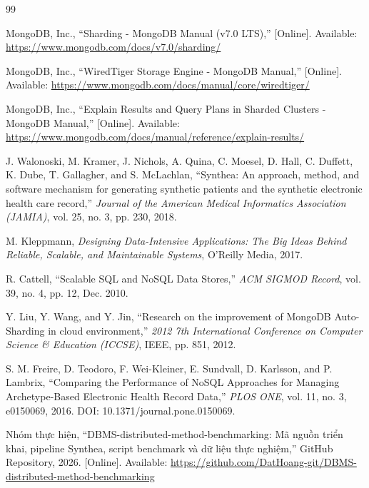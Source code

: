 \documentclass[a4paper,12pt,oneside]{book}
\begin{document}
\begin{thebibliography}{99}

MongoDB, Inc., “Sharding - MongoDB Manual (v7.0 LTS),” [Online]. Available: \url{https://www.mongodb.com/docs/v7.0/sharding/}

MongoDB, Inc., “WiredTiger Storage Engine - MongoDB Manual,” [Online]. Available: \url{https://www.mongodb.com/docs/manual/core/wiredtiger/}

MongoDB, Inc., “Explain Results and Query Plans in Sharded Clusters - MongoDB Manual,” [Online]. Available: \url{https://www.mongodb.com/docs/manual/reference/explain-results/}

J. Walonoski, M. Kramer, J. Nichols, A. Quina, C. Moesel, D. Hall, C. Duffett, K. Dube, T. Gallagher, and S. McLachlan, “Synthea: An approach, method, and software mechanism for generating synthetic patients and the synthetic electronic health care record,” {\em Journal of the American Medical Informatics Association (JAMIA)}, vol. 25, no. 3, pp. 230, 2018.

M. Kleppmann, {\em Designing Data-Intensive Applications: The Big Ideas Behind Reliable, Scalable, and Maintainable Systems}, O'Reilly Media, 2017.

R. Cattell, “Scalable SQL and NoSQL Data Stores,” {\em ACM SIGMOD Record}, vol. 39, no. 4, pp. 12, Dec. 2010.

Y. Liu, Y. Wang, and Y. Jin, “Research on the improvement of MongoDB Auto-Sharding in cloud environment,” {\em 2012 7th International Conference on Computer Science \& Education (ICCSE)}, IEEE, pp. 851, 2012.

S. M. Freire, D. Teodoro, F. Wei-Kleiner, E. Sundvall, D. Karlsson, and P. Lambrix, “Comparing the Performance of NoSQL Approaches for Managing Archetype-Based Electronic Health Record Data,” {\em PLOS ONE}, vol. 11, no. 3, e0150069, 2016. DOI: 10.1371/journal.pone.0150069.

Nhóm thực hiện, “DBMS-distributed-method-benchmarking: Mã nguồn triển khai, pipeline Synthea, script benchmark và dữ liệu thực nghiệm,” GitHub Repository, 2026. [Online]. Available: \url{https://github.com/DatHoang-git/DBMS-distributed-method-benchmarking}

\end{thebibliography}
\end{document}
